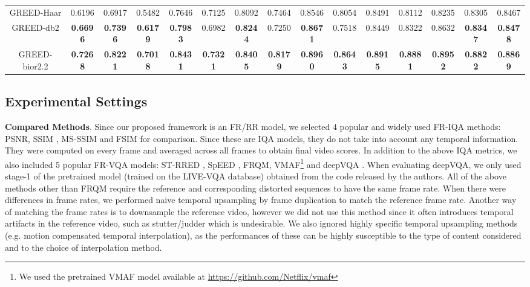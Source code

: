 \documentclass[journal]{IEEEtran}
\newcommand{\eg}{{e}.{g}.}
\begin{document}
\begin{table*}[t]
{\begin{tabular}{|c||c|c|c|c|c|c|c|c|c|c|c|c|c|c|}
			GREED-Haar & 0.6196 & 0.6917 & 0.5482 & 0.7646 & 0.7125 & 0.8092 & 0.7464 & 0.8546 & 0.8054 & 0.8491 & 0.8112 & 0.8235 & 0.8305 & 0.8467\\
			GREED-db2 & \textbf{0.6696} & \textbf{0.7396} & \textbf{0.6179} & \textbf{0.7983} & 0.6982 & \textbf{0.8244} & 0.7250 & \textbf{0.8671} & 0.7518 & 0.8449 & 0.8322 & 0.8632 & \textbf{0.8347} & \textbf{0.8478}\\
			GREED-bior2.2 & \textbf{0.7268} & \textbf{0.8221} & \textbf{0.7018} & \textbf{0.8431} & \textbf{0.7321} & \textbf{0.8405} & \textbf{0.8179} & \textbf{0.8960} & \textbf{0.8643} & \textbf{0.8915} & \textbf{0.8881} & \textbf{0.8952} & \textbf{0.8822} & \textbf{0.8869}\\
			\hline
		\end{tabular}
	}
\end{table*}

\subsection{Experimental Settings}
\textbf{Compared Methods}.
Since our proposed framework is an FR/RR model, we selected 4 popular and widely used FR-IQA methods: PSNR, SSIM \cite{wang2004image}, MS-SSIM \cite{wang2003multiscale} and FSIM \cite{zhang2011fsim} for comparison. Since these are IQA models, they do not take into account any temporal information. They were computed on every frame and averaged across all frames to obtain final video scores. In addition to the above IQA metrics, we also included 5 popular FR-VQA models: ST-RRED \cite{soundararajan2012video}, SpEED \cite{bampis2017speed}, FRQM\cite{zhang2017frame}, VMAF\footnote{We used the pretrained VMAF model available at \url{https://github.com/Netflix/vmaf}} \cite{VMAF2016} and deepVQA \cite{kim2018deep}. When evaluating deepVQA, we only used stage-1 of the pretrained model (trained on the LIVE-VQA \cite{seshadrinathan2010study} database) obtained from the code released by the authors. All of the above methods other than FRQM require the reference and corresponding distorted sequences to have the same frame rate. When there were differences in frame rates, we performed naive temporal upsampling by frame duplication to match the reference frame rate. Another way of matching the frame rates is to downsample the reference video, however we did not use this method since it often introduces temporal artifacts in the reference video, such as stutter/judder which is undesirable. We also ignored highly specific temporal upsampling methods (\eg{} motion compensated temporal interpolation), as the performances of these can be highly susceptible to the type of content considered and to the choice of interpolation method.
\end{document}
